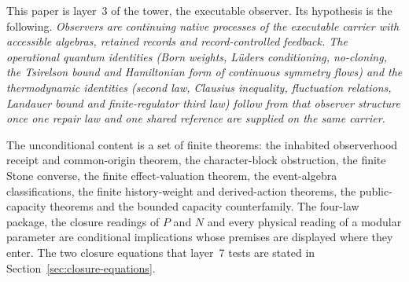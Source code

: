 \documentclass[11pt]{article}
\begin{document}
This paper is layer~3 of the tower, the executable observer. Its hypothesis
is the following.
\emph{Observers are continuing native processes of the executable carrier
with accessible algebras, retained records and record-controlled feedback.
The operational quantum identities (Born weights, L\"uders conditioning,
no-cloning, the Tsirelson bound and Hamiltonian form of continuous symmetry
flows) and the thermodynamic identities (second law, Clausius inequality,
fluctuation relations, Landauer bound and finite-regulator third law) follow
from that observer structure once one repair law and one shared reference are
supplied on the same carrier.}

The unconditional content is a set of finite theorems: the inhabited
observerhood receipt and common-origin theorem, the character-block
obstruction, the finite Stone converse, the finite effect-valuation theorem,
the event-algebra classifications, the finite history-weight and derived-action
theorems, the public-capacity theorems and the bounded capacity counterfamily.
The four-law package, the closure readings of \(P\) and \(N\) and every
physical reading of a modular parameter are conditional implications whose
premises are displayed where they enter. The two closure equations that
layer~7 tests are stated in Section~\ref{sec:closure-equations}.
\end{document}
